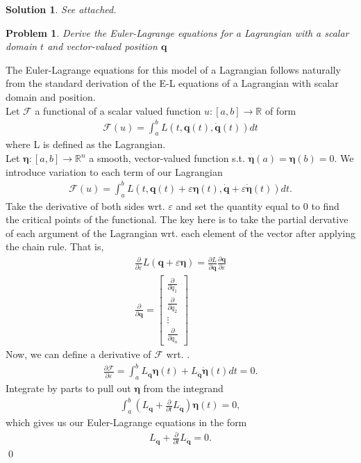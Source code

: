 \documentclass[12pt]{article}
\newtheorem*{sol}{Solution}
\newtheorem{problem}{Problem}
\begin{document}
\begin{sol}
    See attached.
\end{sol}

\newpage
\begin{problem}
Derive the Euler-Lagrange equations for a Lagrangian with a scalar domain $t$ and vector-valued position $\textbf{q}$ 
\end{problem}

The Euler-Lagrange equations for this model of a Lagrangian follows naturally from the standard derivation of the E-L equations of a Lagrangian with scalar domain and position. \\

Let $\mathcal{F}$ a functional of a scalar valued function $u:[a,b]\rightarrow \mathbb{R}$ of form
\begin{align*}
\mathcal{F}(u) = \int_a^b L(t, \boldsymbol{q}(t), \dot{\boldsymbol{q}}(t))dt
\end{align*}
where L is defined as the Lagrangian. \\

Let $\bm{\eta}:[a,b] \rightarrow \mathbb{R}^n$ a smooth, vector-valued function s.t. $\bm{\eta}(a) = \bm{\eta}(b) = 0$. We introduce variation to each term of our Lagrangian
\begin{align*}
\mathcal{F}(u) = \int_a^b L(t, \bm{q}(t)+\varepsilon\bm{\eta}(t), \dot{\bm{q}}+\varepsilon\dot{\bm{\eta}}(t)) dt.
\end{align*}
Take the derivative of both sides wrt. $\varepsilon$ and set the quantity equal to 0 to find the critical points of the functional. The key here is to take the partial dervative of each argument of the Lagrangian wrt. each element of the vector after applying the chain rule. That is,
\begin{gather*}
    \frac{\partial}{\partial\varepsilon}L(\bm{q}+\varepsilon\bm{\eta}) = \frac{\partial L}{\partial \bm{q}}\frac{\partial \bm{q}}{\partial \varepsilon}\\
    \frac{\partial}{\partial\bm{q}} =  \begin{bmatrix}
    \frac{\partial}{\partial q_1} \\[6pt]
    \frac{\partial}{\partial q_2} \\[6pt]
    \vdots \\[6pt]
    \frac{\partial}{\partial q_n} 
    \end{bmatrix}
\end{gather*}
Now, we can define a derivative of $\mathcal{F}$ wrt. \varepsilon.
\begin{align*}
    \frac{\partial\mathcal{F}}{\partial\varepsilon} = \int_a^b L_{\bm{q}} \bm{\eta}(t) + L_{\dot{\bm{q}}} \dot{\bm{\eta}}(t)dt = 0.
\end{align*}
Integrate by parts to pull out $\bm{\eta}$ from the integrand
\begin{align*}
    \int_a^b (L_{\bm{q}} + \frac{\partial}{\partial t} L_{\dot{\bm{q}}})  \bm{\eta}(t) = 0,
\end{align*}
which gives us our Euler-Lagrange equations in the form
\begin{align*}
    L_{\bm{q}} + \frac{\partial}{\partial t} L_{\dot{\bm{q}}} = 0. 
\end{align*}
\qed
\end{document}
